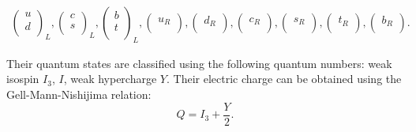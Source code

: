 \begin{align}
\begin{pmatrix}
u \\
d \\
\end{pmatrix}_L,
\begin{pmatrix}
c  \\
s\\
\end{pmatrix}_L,
\begin{pmatrix}
b\\
t \\
\end{pmatrix}_L,
\begin{pmatrix}
u_R \\
\end{pmatrix},
\begin{pmatrix}
d_R \\
\end{pmatrix},
\begin{pmatrix}
c_R \\
\end{pmatrix},
\begin{pmatrix}
s_R \\
\end{pmatrix},
\begin{pmatrix}
t_R \\
\end{pmatrix},
\begin{pmatrix}
b_R \\
\end{pmatrix}.
\end{align}

Their quantum states are classified using the following quantum numbers: weak isospin $I_3$, $I$, weak hypercharge $Y$. Their electric charge can be obtained using the Gell-Mann-Nishijima relation:
  \begin{equation}
Q = I_3+\frac{Y}{2}.
\end{equation}

